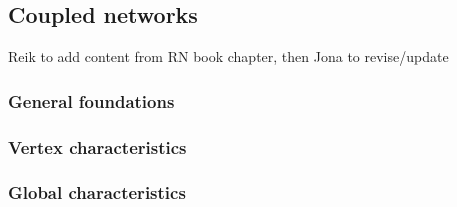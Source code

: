 	\subsection{Coupled networks}
    Reik to add content from RN book chapter, then Jona to revise/update
    
		\subsubsection{General foundations}
		\subsubsection{Vertex characteristics}
		\subsubsection{Global characteristics}
